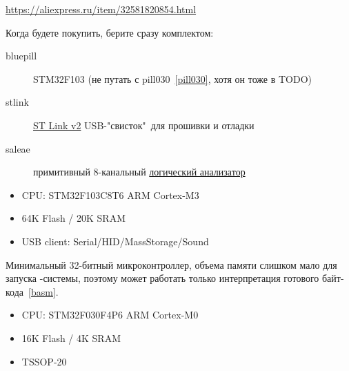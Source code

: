\clearpage
{}\label{pill103}\secdown

\url{https://aliexpress.ru/item/32581820854.html}

\bigskip\noindent
Когда будете покупить, берите сразу комплектом:
\begin{description}
    \item[bluepill] STM32F103 (не путать с pill030\ \ref{pill030}, хотя он тоже в TODO)
    \item[stlink] \href{https://aliexpress.ru/item/32719963657.html}{ST Link v2}
    USB-"свисток"\ для прошивки и отладки
    \item[saleae] примитивный 8-канальный
    \href{https://aliexpress.ru/item/4000192339928.html}{логический анализатор}
\end{description}

\begin{itemize}[nosep]
    \item CPU: STM32F103C8T6 ARM Cortex-M3
    \item 64K Flash / 20K SRAM
    \item USB client: Serial/HID/MassStorage/Sound
\end{itemize}

\clearpage
{}

\secup

\clearpage
{}\label{pill030}\secdown

\noindent
Минимальный 32-битный микроконтроллер, объема памяти слишком мало для запуска
\F-системы, поэтому может работать только интерпретация готового байт-кода\
\ref{basm}.

\medskip
\begin{itemize}[nosep]
    \item CPU: STM32F030F4P6 ARM Cortex-M0
    \item 16K Flash / 4K SRAM
    \item TSSOP-20
\end{itemize}

\clearpage
{}

\secup
